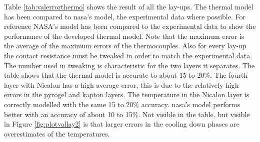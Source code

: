 Table \ref{tab:valerrorthermo} shows the result of all the lay-ups. The thermal model has been compared to \gls{nasa}'s model, the experimental data where possible. For reference NASA's model has been compared to the experimental data to show the performance of the developed thermal model. Note that the maximum error is the average of the maximum errors of the thermocouples. Also for every lay-up the contact resistance must be tweaked in order to match the experimental data. The number used in tweaking is characteristic for the two layers it separates. The table shows that the thermal model is accurate to about 15 to 20\%. The fourth layer with Nicalon has a high average error, this is due to the relatively high errors in the pyrogel and kapton layers. The temperature in the Nicalon layer is correctly modelled with the same 15 to 20\% accuracy. \gls{nasa}'s model performs better with an accuracy of about 10 to 15\%. Not visible in the table, but visible in Figure \ref{fig:plotvallay2} is that larger errors in the cooling down phases are overestimates of the temperatures.


